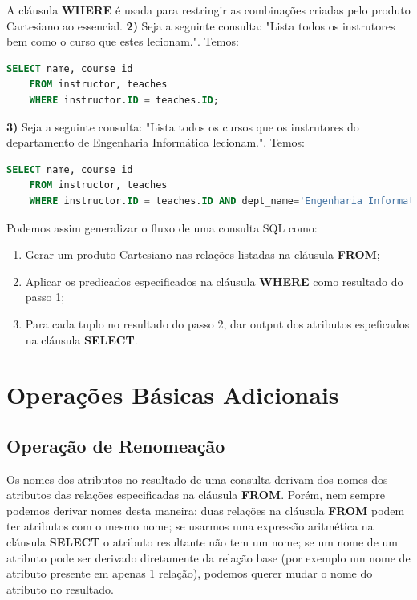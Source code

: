 \documentclass[oneside]{book}
\theoremstyle{definition}
\begin{document}
A cláusula \textbf{WHERE} é usada para restringir as combinações criadas pelo produto Cartesiano ao essencial.
\textbf{2)} Seja a seguinte consulta: "Lista todos os instrutores bem como o curso que estes lecionam.". Temos:
\begin{lstlisting}[language=SQL, morekeywords={REFERENCES, REFRESH, MATERIALIZED, CONCURRENTLY}, framesep=8pt, xleftmargin=40pt, framexleftmargin=40pt, frame=tb, framerule=0pt]
    SELECT name, course_id
    FROM instructor, teaches
    WHERE instructor.ID = teaches.ID;
\end{lstlisting}

\textbf{3)} Seja a seguinte consulta: "Lista todos os cursos que os instrutores do departamento de Engenharia Informática lecionam.". Temos:
\begin{lstlisting}[language=SQL, morekeywords={REFERENCES, REFRESH, MATERIALIZED, CONCURRENTLY}, framesep=8pt, xleftmargin=40pt, framexleftmargin=40pt, frame=tb, framerule=0pt]
    SELECT name, course_id
    FROM instructor, teaches
    WHERE instructor.ID = teaches.ID AND dept_name='Engenharia Informatica';
\end{lstlisting}

Podemos assim generalizar o fluxo de uma consulta SQL como:
\begin{enumerate}[label=\color{blue}\theenumi]
    \item Gerar um produto Cartesiano nas relações listadas na cláusula \textbf{FROM};
    \item Aplicar os predicados especificados na cláusula \textbf{WHERE} como resultado do passo 1;
    \item Para cada tuplo no resultado do passo 2, dar output dos atributos espeficados na cláusula \textbf{SELECT}.
\end{enumerate}

\section{Operações Básicas Adicionais}

\subsection{Operação de Renomeação}
Os nomes dos atributos no resultado de uma consulta derivam dos nomes dos atributos das relações especificadas na cláusula \textbf{FROM}.
Porém, nem sempre podemos derivar nomes desta maneira: duas relações na cláusula \textbf{FROM} podem ter atributos com o mesmo nome; se usarmos uma expressão aritmética na cláusula \textbf{SELECT} o atributo resultante não tem um nome; se um nome de um atributo pode ser derivado diretamente da relação base (por exemplo um nome de atributo presente em apenas 1 relação), podemos querer mudar o nome do atributo no resultado.
\end{document}
